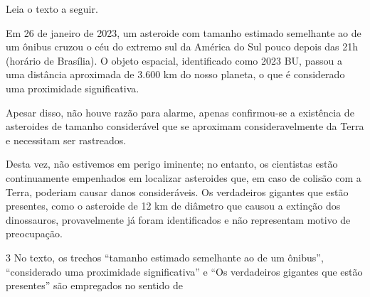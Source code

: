 
Leia o texto a seguir.

\begin{myquote}
Em 26 de janeiro de 2023, um asteroide com tamanho estimado semelhante
ao de um ônibus cruzou o céu do extremo sul da América do Sul pouco
depois das 21h (horário de Brasília). O objeto espacial, identificado
como 2023 BU, passou a uma distância aproximada de 3.600 km do nosso
planeta, o que é considerado uma proximidade significativa.

Apesar disso, não houve razão para alarme, apenas confirmou-se a
existência de asteroides de tamanho considerável que se aproximam
consideravelmente da Terra e necessitam ser rastreados.

Desta vez, não estivemos em perigo iminente; no entanto, os cientistas
estão continuamente empenhados em localizar asteroides que, em caso de
colisão com a Terra, poderiam causar danos consideráveis. Os verdadeiros
gigantes que estão presentes, como o asteroide de 12 km de diâmetro que
causou a extinção dos dinossauros, provavelmente já foram identificados
e não representam motivo de preocupação.

\end{myquote}

\num{3} No texto, os trechos ``tamanho estimado semelhante ao de um ônibus'',
``considerado uma proximidade significativa'' e ``Os verdadeiros
gigantes que estão presentes'' são empregados no sentido de

